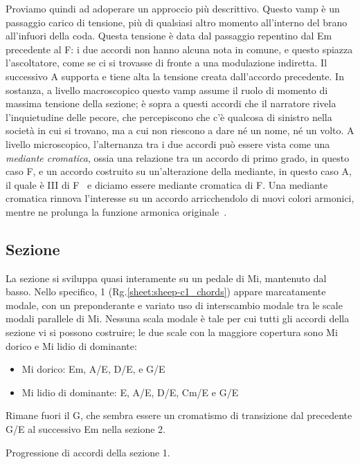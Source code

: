 \documentclass[class=book, crop=false, oneside, 12pt]{standalone}
\begin{document}
    Proviamo quindi ad adoperare un approccio più descrittivo. Questo vamp è un passaggio carico di tensione, più di qualsiasi altro momento all'interno del brano all'infuori della coda. Questa tensione è data dal passaggio repentino dal Em precedente al F\sharp : i due accordi non hanno alcuna nota in comune, e questo spiazza l'ascoltatore, come se ci si trovasse di fronte a una modulazione indiretta. Il successivo A supporta e tiene alta la tensione creata dall'accordo precedente. In sostanza, a livello macroscopico questo vamp assume il ruolo di momento di massima tensione della sezione; è sopra a questi accordi che il narratore rivela l'inquietudine delle pecore, che percepiscono che c'è qualcosa di sinistro nella società in cui si trovano, ma a cui non riescono a dare né un nome, né un volto. A livello microscopico, l'alternanza tra i due accordi può essere vista come una \emph{mediante cromatica}, ossia una relazione tra un accordo di primo grado, in questo caso F\sharp, e un accordo costruito su un'alterazione della mediante,  in questo caso A, il quale è \flat III di F\sharp~ e diciamo essere mediante cromatica di F\sharp. Una mediante cromatica rinnova l'interesse su un accordo arricchendolo di nuovi colori armonici, mentre ne prolunga la funzione armonica originale~\cite[12.2, p. 202]{benward2014music}.


    \subsection{Sezione }
    La sezione  si sviluppa quasi interamente su un pedale di Mi, mantenuto dal basso. Nello specifico, 1 (Rg.\ref{sheet:sheep-c1_chords}) appare marcatamente modale, con un preponderante e variato uso di interscambio modale tra le scale modali parallele di Mi. Nessuna scala modale è tale per cui tutti gli accordi della sezione vi si possono costruire; le due scale con la maggiore copertura sono Mi dorico e Mi lidio di dominante:
    \begin{itemize}
        \item Mi dorico: Em, A/E, D/E, e G/E
        \item Mi lidio di dominante: E, A/E, D/E, C\sharp m/E e G/E
    \end{itemize}

    Rimane fuori il G\flat, che sembra essere un cromatismo di transizione dal precedente G/E al successivo Em nella sezione 2.
    
    \begin{sheet}[htb]
        \centering
        \caption[Progressione di accordi della sezione 1.]{Progressione di accordi della sezione 1.}
        \label{sheet:sheep-c1_chords}
    \end{sheet}
\end{document}
